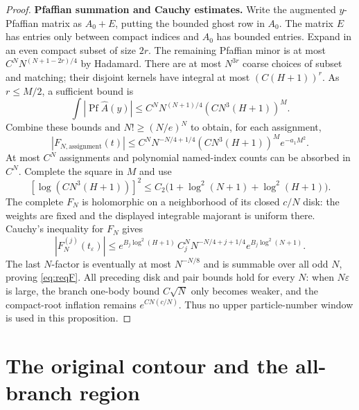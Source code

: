 \documentclass[11pt]{article}
\numberwithin{equation}{section}
\theoremstyle{definition}
\newcommand{\eps}{\varepsilon}
\newcommand{\Pf}{\operatorname{Pf}}
\begin{document}
\begin{proof}
\par\smallskip\noindent\textbf{Pfaffian summation and Cauchy estimates.} Write the augmented \(y\)-Pfaffian matrix as \(A_0+E\), putting the bounded ghost row in \(A_0\). The matrix \(E\) has entries
only between compact indices and \(A_0\) has bounded entries.
Expand in an even compact subset of size \(2r\). The remaining
Pfaffian minor is at most \(C^N N^{(N+1-2r)/4}\) by Hadamard.
There are at most \(N^{3r}\) coarse choices of subset and matching;
their disjoint kernels have integral at most \((C(H+1))^r\).
As \(r\le M/2\), a sufficient bound is
\[
 \int|\Pf\widehat A(y)|\le C^N N^{(N+1)/4}(CN^3(H+1))^M.
 \]
Combine these bounds and \(N!\ge(N/e)^N\) to obtain, for each assignment,
\[
 |F_{N,\mathrm{assignment}}(t)|
 \le C^N N^{-N/4+1/4}(CN^3(H+1))^M e^{-a_1M^2}.
 \]
At most $C^N$ assignments and polynomial named-index counts can be
absorbed in $C^N$. Complete the square in $M$ and use
\[
 [\log(CN^3(H+1))]^2\le C_2\bigl(1+\log^2(N+1)+\log^2(H+1)\bigr).
\]
The complete $F_N$ is holomorphic on a neighborhood of its closed
$c/N$ disk: the weights are fixed and the displayed integrable
majorant is uniform there. Cauchy's inequality for $F_N$ gives
\[
 |F_N^{(j)}(t_\eps)|\le
 e^{B_j\log^2(H+1)}\,
 C_j^N N^{-N/4+j+1/4}e^{B_j\log^2(N+1)}.
\]
The last $N$-factor is eventually at most $N^{-N/8}$ and is
summable over all odd $N$, proving \eqref{eq:reqF}. All preceding
disk and pair bounds hold for every $N$: when $N\eps$ is large,
the branch one-body bound $C\sqrt N$ only becomes weaker, and
the compact-root inflation remains $e^{CN(c/N)}$. Thus no upper
particle-number window is used in this proposition.
\end{proof}



\section{The original contour and the all-branch region}
\label{sec:K}
\end{document}
